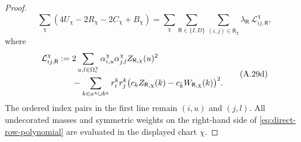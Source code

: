 \documentclass[11pt]{article}
\begin{document}
\begin{proof}
\begin{equation}
\sum_\chi(4U_\chi-2R_\chi-2C_\chi+B_\chi)
=\sum_\chi\sum_{\mathsf R\in\{I,D\}}
 \sum_{(i,j)\in\mathsf R_\chi}
 \lambda_{\mathsf R}\,\mathcal L_{ij,\mathsf R}^{\chi},
\tag{A.29c}
\end{equation}
where
\begin{equation}\label{eq:direct-row-polynomial}
\begin{aligned}
\mathcal L_{ij,\mathsf R}^{\chi}:={}&
2\sum_{u,l\in\Omega_{\rm c}^{\chi}}
 \alpha_{i,u}^{\chi}\alpha_{j,l}^{\chi}
 Z_{\mathsf R,\chi}(u)^2\\
&-\sum_{k\in a^\chi\cup b^\chi}
 r_i^kr_j^k
 \bigl(c_kZ_{\mathsf R,\chi}(k)
       -c_{\bar k}W_{\mathsf R,\chi}(k)\bigr)^2.
\end{aligned}
\tag{A.29d}
\end{equation}
The ordered index pairs in the first line remain $(i,u)$ and $(j,l)$.
All undecorated masses and symmetric weights on the right-hand side of
\eqref{eq:direct-row-polynomial} are evaluated in the displayed chart
$\chi$.


\end{proof}
\end{document}
